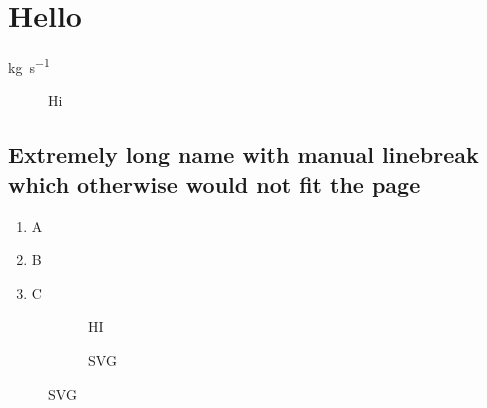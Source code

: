 \chapter{Hello}
\label{sec:hello}

\cite[Hi][Goofy]{IEEEexample:article_typical}

\si{\kilo\gram\per\second}

\begin{figure}[h]
\centering
\caption{Hi}
\label{fig:hi}
\end{figure}

\section[Extremely long name with manual linebreak which otherwise would not fit the page]{Extremely long name with manual linebreak\\which otherwise would not fit the page} %

\begin{enumerate}
    \item A
    \item B
    \item C
\end{enumerate}

\begin{figure}[h]
    \centering
    \begin{minipage}[t]{.49\linewidth}
    \begin{figure}[H]
	\centering
	\caption{HI}
	\label{fig:c}
    \end{figure}
    \end{minipage}
    \hfill
    \begin{minipage}[t]{.49\linewidth}
    \begin{figure}[H]
	\centering
	\caption{SVG}
	\label{fig:svg}
    \end{figure}
    \end{minipage}
\end{figure}


